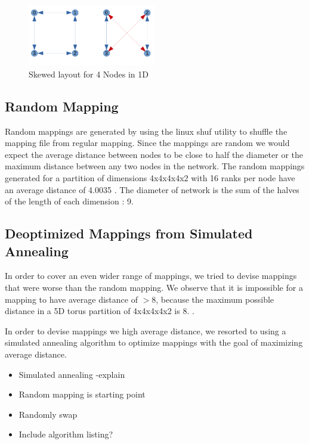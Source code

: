 \documentclass{acm_proc_article-sp}
\begin{document}
\label{sect:Skewed mapping in 1D}
\begin{figure}
  \center
  \includegraphics[width=0.5\textwidth]{skewed_layout_cropped.pdf}
  \caption{Skewed layout for 4 Nodes in 1D}
    \label{fig:Skewed layout for 4 Nodes in 1D}
\end{figure}

\subsection{Random Mapping}

Random mappings are generated by using the linux shuf utility to shuffle the mapping file from regular mapping.
Since the mappings are random we would expect the average distance between nodes to be close to half the diameter
or the maximum distance between any two nodes in the network. The random mappings generated for a partition of
dimensions 4x4x4x4x2 with 16 ranks per node have an average distance of 4.0035 .
The diameter of network is the sum of the halves of the length of each dimension : 9.



\subsection{Deoptimized Mappings from Simulated Annealing}
In order to cover an even wider range of mappings, we tried to
devise mappings that were worse than the random mapping.
We observe that it is impossible for a mapping to have
average distance of $>8$, because the maximum possible distance
in a 5D torus partition of 4x4x4x4x2 is 8.  .

In order to devise mappings we high average distance, we resorted
to using a simulated annealing algorithm to optimize mappings
with the goal of maximizing average distance.

\begin{itemize}
  \item Simulated annealing -explain
  \item Random mapping is starting point
  \item Randomly swap
  \item Include algorithm listing?
\end{itemize}
\end{document}
